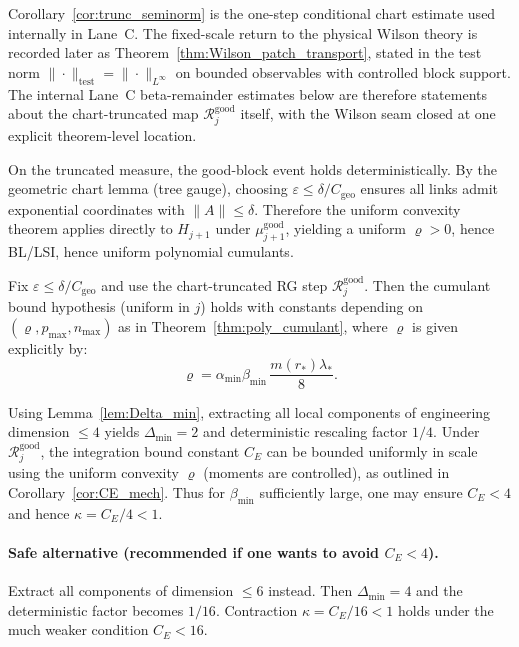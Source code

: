 \begin{remark}\label{prop:RG_diff}
Corollary~\ref{cor:trunc_seminorm} is the one-step conditional chart estimate used internally in Lane~C.
The fixed-scale return to the physical Wilson theory is recorded later as Theorem~\ref{thm:Wilson_patch_transport}, stated in the test norm $\|\cdot\|_{\mathrm{test}}=\|\cdot\|_{L^\infty}$ on bounded observables with controlled block support.
The internal Lane~C beta-remainder estimates below are therefore statements about the chart-truncated map $\mathcal R_j^{\mathrm{good}}$ itself, with the Wilson seam closed at one explicit theorem-level location.
\end{remark}


On the truncated measure, the good-block event holds deterministically. By the geometric chart lemma (tree gauge), choosing $\varepsilon\le \delta/C_{\mathrm{geo}}$
ensures all links admit exponential coordinates with $\|A\|\le \delta$.
Therefore the uniform convexity theorem applies directly to $H_{j+1}$ under $\mu_{j+1}^{\mathrm{good}}$, yielding a uniform $\varrho>0$,
hence BL/LSI, hence uniform polynomial cumulants.

\begin{corollary}\label{cor:cumulants_good}
Fix $\varepsilon\le \delta/C_{\mathrm{geo}}$ and use the chart-truncated RG step $\mathcal R_j^{\mathrm{good}}$.
Then the cumulant bound hypothesis (uniform in $j$) holds with constants depending on $(\varrho,p_{\max},n_{\max})$ as in Theorem~\ref{thm:poly_cumulant},
where $\varrho$ is given explicitly by:
\[
\varrho=\alpha_{\min}\beta_{\min}\,\frac{m(r_\ast)\lambda_\ast}{8}.
\]
\end{corollary}

Using Lemma~\ref{lem:Delta_min}, extracting all local components of engineering dimension $\le 4$ yields $\Delta_{\min}=2$ and deterministic rescaling factor $1/4$.
Under $\mathcal R_j^{\mathrm{good}}$, the integration bound constant $C_E$ can be bounded uniformly in scale using the uniform convexity $\varrho$ (moments are controlled),
as outlined in Corollary~\ref{cor:CE_mech}. Thus for $\beta_{\min}$ sufficiently large, one may ensure $C_E<4$ and hence $\kappa=C_E/4<1$.

\paragraph{Safe alternative (recommended if one wants to avoid $C_E<4$).}
Extract all components of dimension $\le 6$ instead. Then $\Delta_{\min}=4$ and the deterministic factor becomes $1/16$.
Contraction $\kappa=C_E/16<1$ holds under the much weaker condition $C_E<16$.

